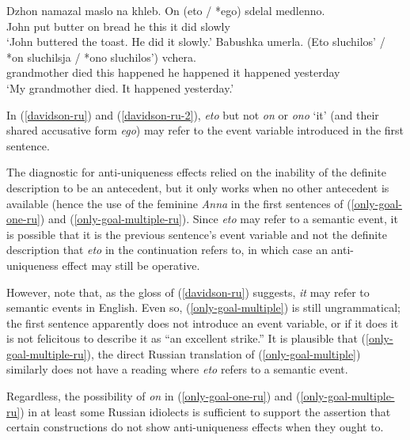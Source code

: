\documentclass{article}
\begin{document}
\begin{exe}
	\ex \label{davidson-ru} \gll Dzhon namazal maslo na khleb. On (eto / *ego) sdelal medlenno.\\
	John put butter on bread he this {} it did slowly\\
	\glt `John buttered the toast. He did it slowly.'
	\ex \label{davidson-ru-2} \gll Babushka umerla. (Eto sluchilos' / *on sluchilsja / *ono sluchilos') vchera.\\
	grandmother died this happened {} he happened {} it happened yesterday \\
	\glt `My grandmother died. It happened yesterday.'
\end{exe}

In (\ref{davidson-ru}) and (\ref{davidson-ru-2}), \textit{eto} but not \textit{on} or \textit{ono} `it' (and their shared accusative form \textit{ego}) may refer to the event variable introduced in the first sentence.

The diagnostic for anti-uniqueness effects relied on the inability of the definite description to be an antecedent, but it only works when no other antecedent is available (hence the use of the feminine \textit{Anna} in the first sentences of (\ref{only-goal-one-ru}) and (\ref{only-goal-multiple-ru}). Since \textit{eto} may refer to a semantic event, it is possible that it is the previous sentence's event variable and not the definite description that \textit{eto} in the continuation refers to, in which case an anti-uniqueness effect may still be operative.

However, note that, as the gloss of (\ref{davidson-ru}) suggests, \textit{it} may refer to semantic events in English. Even so, (\ref{only-goal-multiple}) is still ungrammatical; the first sentence apparently does not introduce an event variable, or if it does it is not felicitous to describe it as ``an excellent strike.'' It is plausible that (\ref{only-goal-multiple-ru}), the direct Russian translation of (\ref{only-goal-multiple}) similarly does not have a reading where \textit{eto} refers to a semantic event.

Regardless, the possibility of \textit{on} in (\ref{only-goal-one-ru}) and (\ref{only-goal-multiple-ru}) in at least some Russian idiolects is sufficient to support the assertion that certain constructions do not show anti-uniqueness effects when they ought to.

\end{document}
